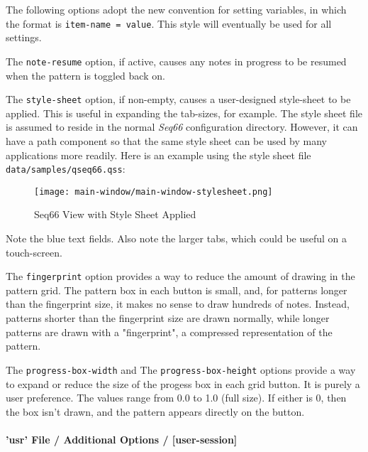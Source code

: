    The following options adopt the new convention for setting variables, in
   which the format is \texttt{item-name = value}.
   This style will eventually be used for all settings.

   The \texttt{note-resume} option, if active, causes any notes in progress
   to be resumed when the pattern is toggled back on.

   The \texttt{style-sheet} option, if non-empty, causes a user-designed
   style-sheet to be applied.  This is useful in expanding the tab-sizes, for
   example.
   The style sheet file is assumed to reside in the normal \textsl{Seq66}
   configuration directory.
   However, it can have a path component so that the same style sheet
   can be used by many applications more readily.
   Here is an example using the style sheet file
   \texttt{data/samples/qseq66.qss}:

\begin{figure}[H]
   \centering 
   \texttt{[image: main-window/main-window-stylesheet.png]}
   \caption{Seq66 View with Style Sheet Applied}
   \label{fig:view_with_style_sheet_applied}
\end{figure}

   Note the blue text fields. Also note the larger tabs, which could be useful on
   a touch-screen.

   The \texttt{fingerprint} option provides a way to reduce the amount of
   drawing in the pattern grid.  The pattern box in each button is small, and,
   for patterns longer than the fingerprint size, it makes no sense to draw
   hundreds of notes.  Instead, patterns shorter than the fingerprint size are
   drawn normally, while longer patterns are drawn with a "fingerprint", a
   compressed representation of the pattern.

   The \texttt{progress-box-width} and
   The \texttt{progress-box-height} options provide a way to expand or reduce
   the size of the progess box in each grid button.
   It is purely a user preference.
   The values range from 0.0 to 1.0 (full size).  If either is 0,
   then the box isn't drawn, and the pattern appears directly on the button.

\paragraph{'usr' File / Additional Options / [user-session]}
\label{paragraph:user_file_added_options_session}

